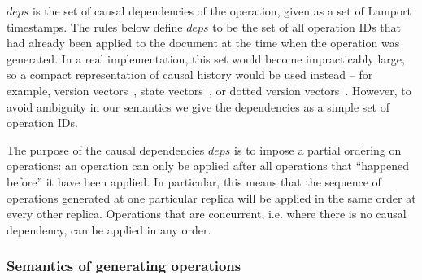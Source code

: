 \documentclass[10pt,journal,compsoc]{IEEEtran}
\begin{document}
$\mathit{deps}$ is the set of causal dependencies of the operation, given as a set of Lamport timestamps. The rules below define $\mathit{deps}$ to be the set of all operation IDs that had already been applied to the document at the time when the operation was generated. In a real implementation, this set would become impracticably large, so a compact representation of causal history would be used instead -- for example, version vectors~\cite{ParkerJr:1983jb}, state vectors~\cite{Ellis:1989ue}, or dotted version vectors~\cite{Preguica:2012fx}. However, to avoid ambiguity in our semantics we give the dependencies as a simple set of operation IDs.

The purpose of the causal dependencies $\mathit{deps}$ is to impose a partial ordering on operations: an operation can only be applied after all operations that ``happened before'' it have been applied. In particular, this means that the sequence of operations generated at one particular replica will be applied in the same order at every other replica. Operations that are concurrent, i.e. where there is no causal dependency, can be applied in any order.

\subsubsection{Semantics of generating operations}
\end{document}

